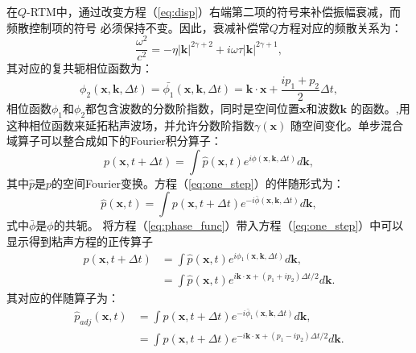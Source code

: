 在$Q$-RTM中，通过改变方程（\ref{eq:disp}）右端第二项的符号来补偿振幅衰减，而频散控制项的符号
必须保持不变。因此，衰减补偿常$Q$方程对应的频散关系为：
\begin{equation}
    \frac{\omega^2}{c^2}=-\eta|\mathbf{k}|^{2\gamma+2}+i\omega\tau|\mathbf{k}|^{2\gamma+1},
	\label{eq:disp1}
\end{equation}
其对应的复共轭相位函数为：
\begin{equation}
	\phi_2(\mathbf{x},\mathbf{k},\Delta t)=\bar{\phi_1}(\mathbf{x},\mathbf{k},\Delta t)
    =\mathbf{k}\cdot\mathbf{x}+\frac{ip_1+p_2}{2}\Delta t,
	\label{eq:phase_func1}
\end{equation}
相位函数$\phi_1$和$\phi_2$都包含波数的分数阶指数，同时是空间位置$\mathbf{x}$和波数$\mathbf{k}$
的函数。,用这种相位函数来延拓粘声波场，并允许分数阶指数$\gamma(\mathbf{x})$
随空间变化。单步混合域算子可以整合成如下的Fourier积分算子：
\begin{equation}
	p(\mathbf{x},t+\Delta t)=\int \hat{p}(\mathbf{x},t)e^{i\phi(\mathbf{x},\mathbf{k},\Delta t)}
	d\mathbf{k},
	\label{eq:one_step}
\end{equation}
其中$\hat{p}$是$p$的空间Fourier变换。方程（\ref{eq:one_step}）的伴随形式为：
\begin{equation}
	\hat{p}(\mathbf{x},t)=\int p(\mathbf{x},t+\Delta t)e^{-i\bar{\phi}(\mathbf{x},\mathbf{k},
	\Delta t)}d\mathbf{k},
\end{equation}
式中$\bar{\phi}$是$\phi$的共轭。
将方程（\ref{eq:phase_func}）带入方程（\ref{eq:one_step}）中可以显示得到粘声方程的正传算子
\begin{equation}
	\begin{aligned}
		p(\mathbf{x},t+\Delta t)&=\int \hat{p}(\mathbf{x},t)e^{i\phi_1(\mathbf{x},
		\mathbf{k},\Delta t)}d\mathbf{k}, \\
		&=\int \hat{p}(\mathbf{x},t)e^{i\mathbf{k}\cdot\mathbf{x}+(p_1+ip_2)\Delta t/2}d\mathbf{k}.
	\end{aligned}
	\label{eq:forward}
\end{equation}
其对应的伴随算子为：
\begin{equation}
	\begin{aligned}
		\hat{p}_{adj}(\mathbf{x},t)&=\int p(\mathbf{x},t+\Delta t)e^{-i\bar{\phi}_1(\mathbf{x},
		\mathbf{k},\Delta t)}d\mathbf{k}, \\
		&=\int \hat{p}(\mathbf{x},t+\Delta t)e^{-i\mathbf{k}\cdot\mathbf{x}+(p_1-ip_2)\Delta t/2}d\mathbf{k}.
	\end{aligned}
	\label{eq:adjoint}
\end{equation}
